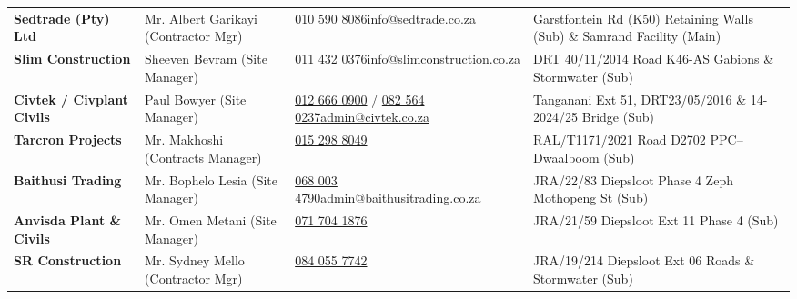 \documentclass[a4paper,11pt]{article}
\begin{document}
\begin{tabularx}{\textwidth}{@{}
    >{\raggedright\arraybackslash}p{3.4cm}
    >{\raggedright\arraybackslash}p{3.2cm}
    >{\raggedright\arraybackslash}p{4.0cm}
    >{\raggedright\arraybackslash}X
@{}}
\fontsize{7.5pt}{9.3pt}\selectfont\bfseries Sedtrade (Pty) Ltd & \fontsize{7.5pt}{9.3pt}\selectfont Mr. Albert Garikayi (Contractor Mgr) & \fontsize{7.5pt}{9.3pt}\selectfont \href{tel:0105908086}{010 590 8086}\newline\href{mailto:info@sedtrade.co.za}{info@sedtrade.co.za} & \fontsize{7.5pt}{9.3pt}\selectfont Garstfontein Rd (K50) Retaining Walls (Sub) \& Samrand Facility (Main) \\
\rowcolor{mhbluelight}
\fontsize{7.5pt}{9.3pt}\selectfont\bfseries Slim Construction & \fontsize{7.5pt}{9.3pt}\selectfont Sheeven Bevram (Site Manager) & \fontsize{7.5pt}{9.3pt}\selectfont \href{tel:0114320376}{011 432 0376}\newline\href{mailto:info@slimconstruction.co.za}{info@slimconstruction.co.za} & \fontsize{7.5pt}{9.3pt}\selectfont DRT 40/11/2014 Road K46-AS Gabions \& Stormwater (Sub) \\
\fontsize{7.5pt}{9.3pt}\selectfont\bfseries Civtek / Civplant Civils & \fontsize{7.5pt}{9.3pt}\selectfont Paul Bowyer (Site Manager) & \fontsize{7.5pt}{9.3pt}\selectfont \href{tel:0126660900}{012 666 0900} / \href{tel:0825640237}{082 564 0237}\newline\href{mailto:admin@civtek.co.za}{admin@civtek.co.za} & \fontsize{7.5pt}{9.3pt}\selectfont Tanganani Ext 51, DRT23/05/2016 \& 14-2024/25 Bridge (Sub) \\
\rowcolor{mhbluelight}
\fontsize{7.5pt}{9.3pt}\selectfont\bfseries Tarcron Projects & \fontsize{7.5pt}{9.3pt}\selectfont Mr. Makhoshi (Contracts Manager) & \fontsize{7.5pt}{9.3pt}\selectfont \href{tel:0152988049}{015 298 8049} & \fontsize{7.5pt}{9.3pt}\selectfont RAL/T1171/2021 Road D2702 PPC--Dwaalboom (Sub) \\
\fontsize{7.5pt}{9.3pt}\selectfont\bfseries Baithusi Trading & \fontsize{7.5pt}{9.3pt}\selectfont Mr. Bophelo Lesia (Site Manager) & \fontsize{7.5pt}{9.3pt}\selectfont \href{tel:0680034790}{068 003 4790}\newline\href{mailto:admin@baithusitrading.co.za}{admin@baithusitrading.co.za} & \fontsize{7.5pt}{9.3pt}\selectfont JRA/22/83 Diepsloot Phase 4 Zeph Mothopeng St (Sub) \\
\rowcolor{mhbluelight}
\fontsize{7.5pt}{9.3pt}\selectfont\bfseries Anvisda Plant \& Civils & \fontsize{7.5pt}{9.3pt}\selectfont Mr. Omen Metani (Site Manager) & \fontsize{7.5pt}{9.3pt}\selectfont \href{tel:0717041876}{071 704 1876} & \fontsize{7.5pt}{9.3pt}\selectfont JRA/21/59 Diepsloot Ext 11 Phase 4 (Sub) \\
\fontsize{7.5pt}{9.3pt}\selectfont\bfseries SR Construction & \fontsize{7.5pt}{9.3pt}\selectfont Mr. Sydney Mello (Contractor Mgr) & \fontsize{7.5pt}{9.3pt}\selectfont \href{tel:0840557742}{084 055 7742} & \fontsize{7.5pt}{9.3pt}\selectfont JRA/19/214 Diepsloot Ext 06 Roads \& Stormwater (Sub) \\
\end{tabularx}
\renewcommand{\arraystretch}{1}
\end{document}
